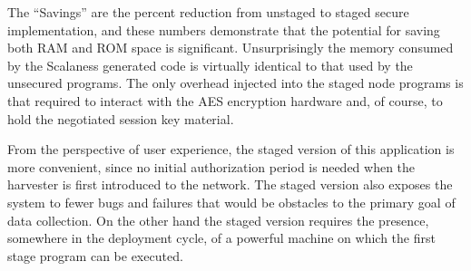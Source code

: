 The ``Savings'' are the percent reduction from unstaged to staged secure implementation, and
these numbers demonstrate that the potential for saving both RAM and ROM space is significant.
Unsurprisingly the memory consumed by the Scalaness generated code is virtually identical to
that used by the unsecured programs. The only overhead injected into the staged node programs is
that required to interact with the AES encryption hardware and, of course, to hold the
negotiated session key material.

From the perspective of user experience, the staged version of this application is more
convenient, since no initial authorization period is needed when the harvester is first
introduced to the network. The staged version also exposes the system to fewer bugs and failures
that would be obstacles to the primary goal of data collection. On the other hand the staged
version requires the presence, somewhere in the deployment cycle, of a powerful machine on which
the first stage program can be executed.

